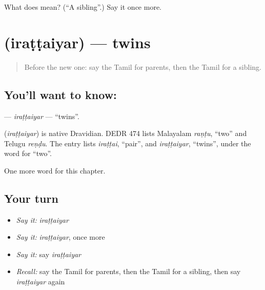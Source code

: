 \begin{tcolorbox}[breakable,colback=teal!4,colframe=teal!35!black,title={Before you move on}]
What does  mean? (\textquotedblleft{}A sibling\textquotedblright{}.) Say it once more.
\end{tcolorbox}
\section[\texorpdfstring{\ta{இரட்டையர்} (iraṭṭaiyar)}{இரட்டையர் (iraṭṭaiyar)}]{ (iraṭṭaiyar) — twins}

\label{lesson:TA-C273-irattaiyar}



\begin{quote}
Before the new one: say the Tamil for parents, then the Tamil for a sibling.
\end{quote}

\subsection*{You'll want to know: }
\textbf{} — \emph{iraṭṭaiyar} — \textquotedblleft{}twins\textquotedblright{}.

\begin{cousinweb}
\textbf{} (\emph{iraṭṭaiyar}) is native Dravidian. DEDR 474 lists Malayalam \emph{raṇṭu}, \textquotedblleft{}two\textquotedblright{} and Telugu \emph{reṇḍu}. The entry lists \emph{iraṭṭai}, \textquotedblleft{}pair\textquotedblright{}, and \emph{iraṭṭaiyar}, \textquotedblleft{}twins\textquotedblright{}, under the word for \textquotedblleft{}two\textquotedblright{}.
\end{cousinweb}

\begin{grammarlens}[title={What you've built}]
One more word for this chapter.
\end{grammarlens}

\subsection*{Your turn}
\begin{itemize}
\raggedright
  \item \emph{Say it:} \emph{iraṭṭaiyar}
  \item \emph{Say it:} \emph{iraṭṭaiyar}, once more
  \item \emph{Say it:} say \emph{iraṭṭaiyar}
  \item \emph{Recall:} say the Tamil for parents, then the Tamil for a sibling, then say \emph{iraṭṭaiyar} again
\end{itemize}

